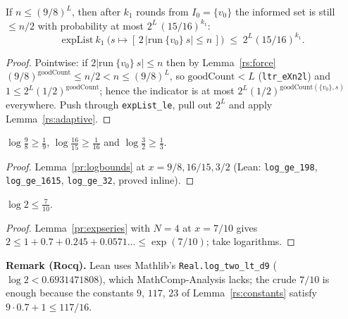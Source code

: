 \begin{lemma}[Phase 1]\label{rs:phase1}
  \rocqok
  If $n \le (9/8)^L$, then after $k_1$ rounds from $I_0 = \{v_0\}$ the
  informed set is still $\le n/2$ with probability at most
  $2^{L}\,(15/16)^{k_1}$:
  \[
    \mathrm{expList}\ k_1\ \bigl(s \mapsto [\,2\,|\mathrm{run}\ \{v_0\}\ s| \le n\,]\bigr)
    \;\le\; 2^L (15/16)^{k_1}.
  \]
\end{lemma}
\begin{proof}
  \rocqok
  Pointwise: if $2|\mathrm{run}\ \{v_0\}\ s| \le n$ then by
  Lemma~\ref{rs:force} $(9/8)^{\mathrm{goodCount}} \le n/2 < n \le (9/8)^L$,
  so $\mathrm{goodCount} < L$ (\texttt{ltr\_eXn2l}) and
  $1 \le 2^L (1/2)^{\mathrm{goodCount}}$; hence the indicator is at most
  $2^L (1/2)^{\mathrm{goodCount}(\{v_0\}, s)}$ everywhere. Push through
  \texttt{expList\_le}, pull out $2^L$ and apply Lemma~\ref{rs:adaptive}.
\end{proof}

\begin{lemma}\label{rs:lnnumerics}
  \rocqok
  $\log\tfrac98 \ge \tfrac19$, $\log\tfrac{16}{15} \ge \tfrac1{16}$ and
  $\log\tfrac32 \ge \tfrac13$.
\end{lemma}
\begin{proof}
  \rocqok
  Lemma~\ref{pr:logbounds} at $x = 9/8, 16/15, 3/2$ (Lean:
  \texttt{log\_ge\_198}, \texttt{log\_ge\_1615}, \texttt{log\_ge\_32},
  proved inline).
\end{proof}

\begin{lemma}[$\log 2 \le 7/10$]\label{rs:ln2}
  \rocqok
  $\log 2 \le \tfrac{7}{10}$.
\end{lemma}
\begin{proof}
  \rocqok
  Lemma~\ref{pr:expseries} with $N = 4$ at $x = 7/10$ gives
  $2 \le 1 + 0.7 + 0.245 + 0.0571\ldots \le \exp(7/10)$; take logarithms.
\end{proof}

\noindent\textbf{Remark (Rocq).} Lean uses Mathlib's
\texttt{Real.log\_two\_lt\_d9} ($\log 2 < 0.6931471808$), which
MathComp-Analysis lacks; the crude $7/10$ is enough because the constants
$9$, $117$, $23$ of Lemma~\ref{rs:constants} satisfy
$9 \cdot 0.7 + 1 \le 117/16$.

